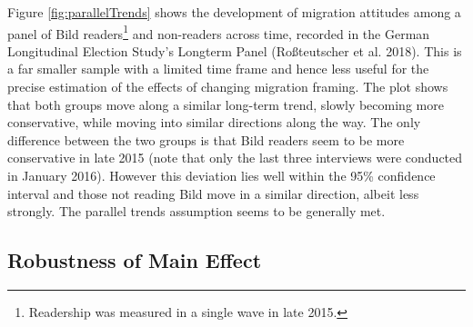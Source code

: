 \documentclass[
]{article}
\begin{document}
Figure \ref{fig:parallelTrends} shows the development of migration attitudes among a panel of Bild readers\footnote{Readership was measured in a single wave in late 2015.} and non-readers across time, recorded in the German Longitudinal Election Study's Longterm Panel (Roßteutscher et al. 2018). This is a far smaller sample with a limited time frame and hence less useful for the precise estimation of the effects of changing migration framing. The plot shows that both groups move along a similar long-term trend, slowly becoming more conservative, while moving into similar directions along the way. The only difference between the two groups is that Bild readers seem to be more conservative in late 2015 (note that only the last three interviews were conducted in January 2016). However this deviation lies well within the 95\% confidence interval and those not reading Bild move in a similar direction, albeit less strongly. The parallel trends assumption seems to be generally met.

\pagebreak

\hypertarget{robustness-of-main-effect}{%
\subsection{Robustness of Main Effect}\label{robustness-of-main-effect}}
\end{document}
